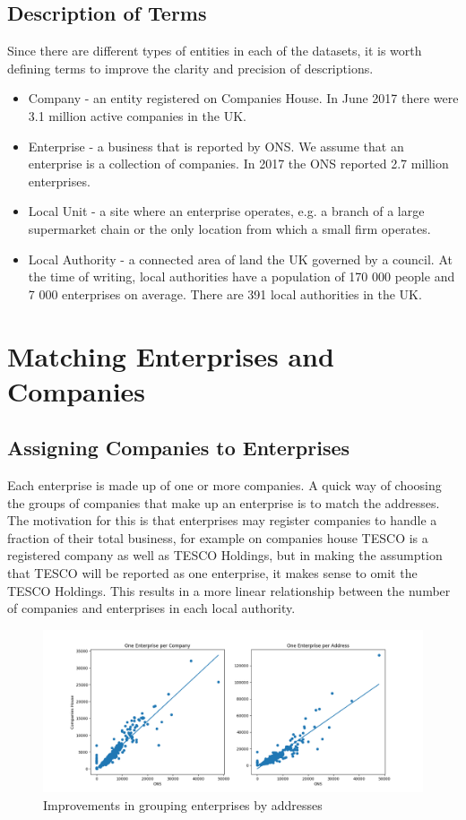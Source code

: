 \documentclass[a4paper,10pt]{article}
\begin{document}
\subsection{Description of Terms}
Since there are different types of entities in each of the datasets, it is worth defining terms to improve the clarity and precision of descriptions.
\begin{itemize}
 \item Company - an entity registered on Companies House. In June 2017 there were 3.1 million active companies in the UK. 
 \item Enterprise - a business that is reported by ONS. We assume that an enterprise is a collection of companies. In 2017 the ONS reported 2.7 million enterprises.
 \item Local Unit - a site where an enterprise operates, e.g. a branch of a large supermarket chain or the only location from which a small firm operates.
 \item Local Authority - a connected area of land the UK governed by a council. At the time of writing, local authorities have a population of 170 000 people and 7 000 enterprises on average. There are 391 local authorities in the UK.
\end{itemize}
\section{Matching Enterprises and Companies}


\subsection{Assigning Companies to Enterprises}
Each enterprise is made up of one or more companies. A quick way of choosing the groups of companies that make up an enterprise is to match the addresses. The motivation for this is that enterprises may register companies to handle a fraction of their total business, for example on companies house TESCO is a registered company as well as TESCO Holdings, but in making the assumption that TESCO will be reported as one enterprise, it makes sense to omit the TESCO Holdings. This results in a more linear relationship between the number of companies and enterprises in each local authority.
\begin{figure}[!ht]
 \includegraphics[width=\textwidth]{graphics/filtered_addresses}
 \caption{Improvements in grouping enterprises by addresses}
\end{figure}
\end{document}
